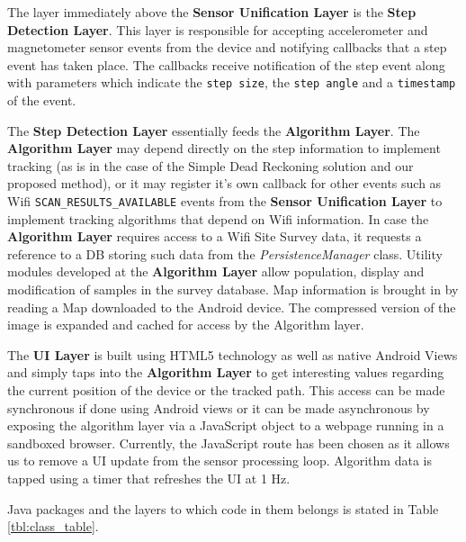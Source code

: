 The layer immediately above the \textbf{Sensor Unification Layer} is the 
\textbf{Step Detection Layer}. This layer is responsible for accepting 
accelerometer and magnetometer sensor events from the device and notifying 
callbacks that a step event has taken place. The callbacks receive 
notification of the step event along with parameters which 
indicate the \texttt{step size}, the \texttt{step angle} and a 
\texttt{timestamp} of the event. 

The \textbf{Step Detection Layer} essentially feeds the \textbf{Algorithm Layer}.
The \textbf{Algorithm Layer} may depend directly on the step information to 
implement tracking (as is in the case of the Simple Dead Reckoning solution
and our proposed method),
or it may register it's own callback for other events such as Wifi 
\texttt{SCAN\_RESULTS\_AVAILABLE} events from the \textbf{Sensor Unification Layer}
to implement tracking algorithms that depend on Wifi information.
In case the \textbf{Algorithm Layer} requires access to a Wifi Site Survey 
data, it requests a reference to a DB storing such data from the 
\emph{PersistenceManager} class. Utility modules developed at the \textbf{Algorithm Layer}
allow population, display and modification of samples in the survey database.
Map information is brought in by reading a Map downloaded to the Android 
device. The compressed version of the image is expanded and cached for 
access by the Algorithm layer.

The \textbf{UI Layer} is built using HTML5 technology as well as native 
Android Views and simply taps into the \textbf{Algorithm Layer} to get 
interesting values regarding the current position of the device or the 
tracked path. This access can be made synchronous if done using 
Android views or it can be made asynchronous by exposing the algorithm 
layer via a JavaScript object to a webpage running in a sandboxed browser.
Currently, the JavaScript route has been chosen as it allows us to 
remove a UI update from the sensor processing loop. Algorithm data is 
tapped using a timer that refreshes the UI at 1 Hz.

Java packages and the layers to which code in them belongs is stated in 
Table \ref{tbl:class_table}.

